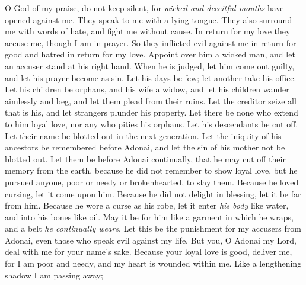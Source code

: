 \begin{biblechapter} %
 O God of my praise, do not keep silent,
\verse for \textit{wicked and deceitful mouths} 
have opened against me. 
They speak to me with a lying tongue.
\verse They also surround me with words of hate, 
and fight me without cause.
\verse In return for my love they accuse me, 
though I am in prayer.
\verse So they inflicted evil against me in return for good 
and hatred in return for my love.
\verse Appoint over him a wicked man, 
and let an accuser stand at his right hand.
\verse When he is judged, let him come out guilty, 
and let his prayer become as sin.
\verse Let his days be few; 
let another take his office.
\verse Let his children be orphans, 
and his wife a widow,
\verse and let his children wander aimlessly and beg, 
and let them plead from their ruins.
\verse Let the creditor seize all that is his, 
and let strangers plunder his property.
\verse Let there be none who extend to him loyal love, 
nor any who pities his orphans.
\verse Let his descendants be cut off. 
Let their name be blotted out in the next generation.
\verse Let the iniquity of his ancestors be remembered before Adonai, 
and let the sin of his mother not be blotted out.
\verse Let them be before Adonai continually, 
that he may cut off their memory from the earth,
\verse because he did not remember to show loyal love, 
but he pursued anyone, poor or needy 
or brokenhearted, to slay them.
\verse Because he loved cursing, let it come upon him. 
Because he did not delight in blessing, 
let it be far from him.
\verse Because he wore a curse as his robe, 
let it enter \textit{his body} like water, 
and into his bones like oil.
\verse May it be for him like a garment in which he wraps, 
and a belt \textit{he continually wears}.
\verse Let this be the punishment for my accusers from Adonai, 
even those who speak evil against my life.
\verse But you, O Adonai my Lord, 
deal with me for your name’s sake. 
Because your loyal love is good, deliver me,
\verse for I am poor and needy, 
and my heart is wounded within me.
\verse Like a lengthening shadow I am passing away; 

\end{biblechapter}
